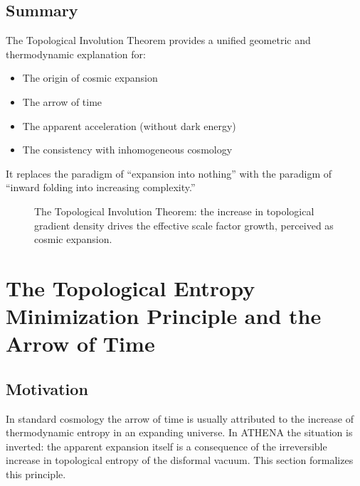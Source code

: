 \documentclass[11pt,a4paper]{article}
\begin{document}
\subsection{Summary}
The Topological Involution Theorem provides a unified geometric and thermodynamic explanation for:
\begin{itemize}
\item The origin of cosmic expansion
\item The arrow of time
\item The apparent acceleration (without dark energy)
\item The consistency with inhomogeneous cosmology
\end{itemize}
It replaces the paradigm of ``expansion into nothing'' with the paradigm of ``inward folding into increasing complexity.''

\begin{figure}[H]
\centering
{}
\caption{The Topological Involution Theorem: the increase in topological gradient density drives the effective scale factor growth, perceived as cosmic expansion.}
\end{figure}

\section{The Topological Entropy Minimization Principle and the Arrow of Time}

\subsection{Motivation}
In standard cosmology the arrow of time is usually attributed to the increase of thermodynamic entropy in an expanding universe. In ATHENA the situation is inverted: the apparent expansion itself is a consequence of the irreversible increase in topological entropy of the disformal vacuum. This section formalizes this principle.
\end{document}
